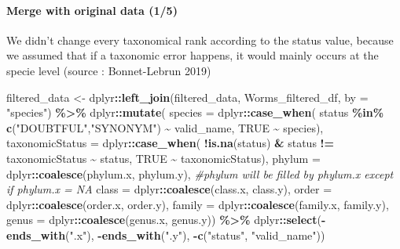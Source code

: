 \documentclass[
]{article}
\newenvironment{Shaded}{\begin{snugshade}}{\end{snugshade}}
\newcommand{\AttributeTok}[1]{\textcolor[rgb]{0.13,0.29,0.53}{#1}}
\newcommand{\CommentTok}[1]{\textcolor[rgb]{0.56,0.35,0.01}{\textit{#1}}}
\newcommand{\ConstantTok}[1]{\textcolor[rgb]{0.56,0.35,0.01}{#1}}
\newcommand{\FunctionTok}[1]{\textcolor[rgb]{0.13,0.29,0.53}{\textbf{#1}}}
\newcommand{\NormalTok}[1]{#1}
\newcommand{\OtherTok}[1]{\textcolor[rgb]{0.56,0.35,0.01}{#1}}
\newcommand{\SpecialCharTok}[1]{\textcolor[rgb]{0.81,0.36,0.00}{\textbf{#1}}}
\newcommand{\StringTok}[1]{\textcolor[rgb]{0.31,0.60,0.02}{#1}}
\begin{document}
\hypertarget{merge-with-original-data-15}{%
\paragraph{Merge with original data
(1/5)}\label{merge-with-original-data-15}}

We didn't change every taxonomical rank according to the status value,
because we assumed that if a taxonomic error happens, it would mainly
occurs at the specie level (source : Bonnet-Lebrun 2019)

\begin{Shaded}
\begin{Highlighting}[]
\NormalTok{filtered\_data }\OtherTok{\textless{}{-}}\NormalTok{ dplyr}\SpecialCharTok{::}\FunctionTok{left\_join}\NormalTok{(filtered\_data, Worms\_filtered\_df, }\AttributeTok{by =} \StringTok{"species"}\NormalTok{) }\SpecialCharTok{\%\textgreater{}\%}
\NormalTok{  dplyr}\SpecialCharTok{::}\FunctionTok{mutate}\NormalTok{(}
    \AttributeTok{species =}\NormalTok{ dplyr}\SpecialCharTok{::}\FunctionTok{case\_when}\NormalTok{(}
\NormalTok{      status }\SpecialCharTok{\%in\%} \FunctionTok{c}\NormalTok{(}\StringTok{"DOUBTFUL"}\NormalTok{,}\StringTok{"SYNONYM"}\NormalTok{) }\SpecialCharTok{\textasciitilde{}}\NormalTok{ valid\_name, }\ConstantTok{TRUE} \SpecialCharTok{\textasciitilde{}}\NormalTok{ species),}
    \AttributeTok{taxonomicStatus =}\NormalTok{ dplyr}\SpecialCharTok{::}\FunctionTok{case\_when}\NormalTok{(}
      \SpecialCharTok{!}\FunctionTok{is.na}\NormalTok{(status) }\SpecialCharTok{\&}\NormalTok{ status }\SpecialCharTok{!=}\NormalTok{ taxonomicStatus }\SpecialCharTok{\textasciitilde{}}\NormalTok{ status,}
      \ConstantTok{TRUE} \SpecialCharTok{\textasciitilde{}}\NormalTok{ taxonomicStatus),}
    \AttributeTok{phylum =}\NormalTok{ dplyr}\SpecialCharTok{::}\FunctionTok{coalesce}\NormalTok{(phylum.x, phylum.y), }\CommentTok{\#phylum will be filled by phylum.x except if phylum.x = NA}
    \AttributeTok{class =}\NormalTok{ dplyr}\SpecialCharTok{::}\FunctionTok{coalesce}\NormalTok{(class.x, class.y),}
    \AttributeTok{order =}\NormalTok{ dplyr}\SpecialCharTok{::}\FunctionTok{coalesce}\NormalTok{(order.x, order.y),}
    \AttributeTok{family =}\NormalTok{ dplyr}\SpecialCharTok{::}\FunctionTok{coalesce}\NormalTok{(family.x, family.y),}
    \AttributeTok{genus =}\NormalTok{ dplyr}\SpecialCharTok{::}\FunctionTok{coalesce}\NormalTok{(genus.x, genus.y)) }\SpecialCharTok{\%\textgreater{}\%}
\NormalTok{  dplyr}\SpecialCharTok{::}\FunctionTok{select}\NormalTok{(}\SpecialCharTok{{-}}\FunctionTok{ends\_with}\NormalTok{(}\StringTok{".x"}\NormalTok{), }\SpecialCharTok{{-}}\FunctionTok{ends\_with}\NormalTok{(}\StringTok{".y"}\NormalTok{), }\SpecialCharTok{{-}}\FunctionTok{c}\NormalTok{(}\StringTok{"status"}\NormalTok{, }\StringTok{"valid\_name"}\NormalTok{))}
\end{Highlighting}
\end{Shaded}
\end{document}
